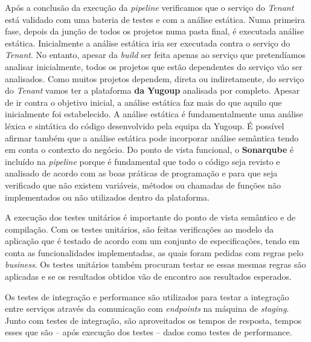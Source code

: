 \hspace{1cm}Após a conclusão da execução da \textit{pipeline} verificamos que o serviço do \textit{Tenant} está validado com uma bateria de testes e com a análise estática. Numa primeira fase, depois da junção de todos os projetos numa pasta final, é executada análise estática. Inicialmente a análise estática iria ser executada contra o serviço do \textit{Tenant}. No entanto, apesar da \textit{build} ser feita apenas ao serviço que pretendíamos analisar inicialmente, todos os projetos que estão dependentes do serviço vão ser analisados. Como muitos projetos dependem, direta ou indiretamente, do serviço do \textit{Tenant} vamos ter a plataforma \textbf{da Yugoup} analisada por completo. Apesar de ir contra o objetivo inicial, a análise estática faz mais do que aquilo que inicialmente foi estabelecido. A análise estática é fundamentalmente uma análise léxica e sintática do código desenvolvido pela equipa da Yugoup. É possível afirmar também que a análise estática pode incorporar análise semântica tendo em conta o contexto do negócio. Do ponto de vista funcional, o \textbf{Sonarqube} é incluído na \textit{pipeline} porque é fundamental que todo o código seja revisto e analisado de acordo com as boas práticas de programação e para que seja verificado que não existem variáveis, métodos ou chamadas de funções não implementados ou não utilizados dentro da plataforma.

\hspace{1cm}A execução dos testes unitários é importante do ponto de vista semântico e de compilação. Com os testes unitários, são feitas verificações ao modelo da aplicação que é testado de acordo com um conjunto de especificações, tendo em conta as funcionalidades implementadas, as quais foram pedidas com regras pelo \textit{business}. Os testes unitários também procuram testar se essas mesmas regras são aplicadas e se os resultados obtidos vão de encontro aos resultados esperados.

\hspace{1cm}Os testes de integração e performance são utilizados para testar a integração entre serviços através da comunicação com \textit{endpoints} na máquina de \textit{staging}. Junto com testes de integração, são aproveitados os tempos de resposta, tempos esses que são -- após execução dos testes -- dados como testes de performance.

